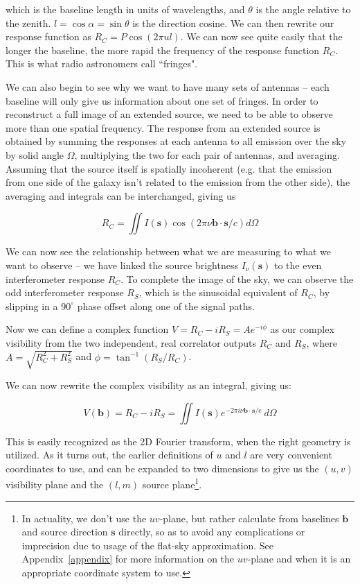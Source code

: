 \noindent which is the baseline length in units of wavelengths, and $\theta$ is 
the angle relative to the zenith. $l = \cos{\alpha} = \sin{\theta}$ is the 
direction cosine. We can then rewrite our response function as $R_C = P \cos{(2 
\pi ul)}$. We can now see quite easily that the longer the baseline, the more 
rapid the frequency of the response function $R_C$. This is what radio 
astronomers call ``fringes".

We can also begin to see why we want to have many sets of antennas -- each 
baseline will only give us information about one set of fringes. In order to 
reconstruct a full image of an extended source, we need to be able to observe 
more than one spatial frequency. The response from an extended source is 
obtained by summing the responses at each antenna to all emission over the sky 
by solid angle $\Omega$, multiplying the two for each pair of antennas, and 
averaging.  Assuming that the source itself is spatially incoherent (e.g. that 
the emission from one side of the galaxy isn't related to the emission from the 
other side), the averaging and integrals can be interchanged, giving us

\begin{equation}
    R_C = \iint I(\mathbf s) \cos(2\pi\nu\mathbf{b}\cdot\mathbf{s}/c) d\Omega
    \label{eq:even-response}
\end{equation}

We can now see the relationship between what we are measuring to what we want 
to observe -- we have linked the source brightness $I_\nu(\mathbf{s})$ to the 
even interferometer response $R_C$. To complete the image of the sky, we can 
observe the odd interferometer response $R_S$, which is the sinusoidal 
equivalent of $R_C$, by slipping in a $90^{\circ}$ phase offset along one of 
the signal paths.   

Now we can define a complex function $V = R_C - iR_S = A e^{-i \phi}$ as our 
complex visibility from the two independent, real correlator outputs $R_C$ and 
$R_S$, where $A = \sqrt{R_C^2 + R_S^2}$ and $\phi = \tan^{-1}{(R_S/R_C)}$.

We can now rewrite the complex visibility as an integral, giving us:

\begin{equation}
    V(\mathbf{b}) = R_C - iR_S = \iint I(\mathbf s) e^{-2\pi i 
    \nu\mathbf{b}\cdot\mathbf{s}/c} ~d\Omega
    \label{eq:vis}
\end{equation}

This is easily recognized as the 2D Fourier transform, when the right geometry 
is utilized. As it turns out, the earlier definitions of $u$ and $l$ are very 
convenient coordinates to use, and can be expanded to two dimensions to give us 
the $(u,v)$ visibility plane and the $(l,m)$ source plane\footnote{In 
actuality, we don't use the $uv$-plane, but rather calculate from baselines 
$\mathbf{b}$ and source direction $\mathbf{s}$ directly, so as to avoid any 
complications or imprecision due to usage of the flat-sky approximation. See 
Appendix~\ref{appendix} for more information on the $uv$-plane and when it is 
an appropriate coordinate system to use.}.  

